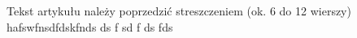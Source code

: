 \documentclass[11pt,twoside]{article}
\begin{document}
 Tekst artykułu należy poprzedzić streszczeniem (ok. 6 do 12 wierszy) 
 hafswfnsdfdskfnds ds
  f
  sd
  f
  ds
  fds
\end{document}
